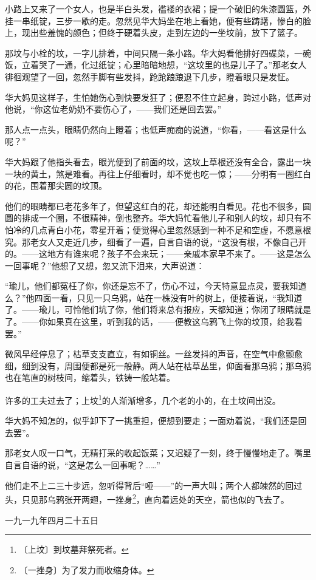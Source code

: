 \documentclass[12pt,UTF-8,openany]{ctexbook}
\begin{document}
\begin{large}
    小路上又来了一个女人，也是半白头发，褴褛的衣裙；提一个破旧的朱漆圆篮，外挂一串纸锭，三步一歇的走。忽然见华大妈坐在地上看她，便有些踌躇，惨白的脸上，现出些羞愧的颜色；但终于硬着头皮，走到左边的一坐坟前，放下了篮子。
    
    那坟与小栓的坟，一字儿排着，中间只隔一条小路。华大妈看他排好四碟菜，一碗饭，立着哭了一通，化过纸锭；心里暗暗地想，“这坟里的也是儿子了。”那老女人徘徊观望了一回，忽然手脚有些发抖，跄跄踉踉退下几步，瞪着眼只是发怔。
    
    华大妈见这样子，生怕她伤心到快要发狂了；便忍不住立起身，跨过小路，低声对他说，“你这位老奶奶不要伤心了，——我们还是回去罢。”
    
    那人点一点头，眼睛仍然向上瞪着；也低声痴痴的说道，“你看，——看这是什么呢？”
    
    华大妈跟了他指头看去，眼光便到了前面的坟，这坟上草根还没有全合，露出一块一块的黄土，煞是难看。再往上仔细看时，却不觉也吃一惊；——分明有一圈红白的花，围着那尖圆的坟顶。
    
    他们的眼睛都已老花多年了，但望这红白的花，却还能明白看见。花也不很多，圆圆的排成一个圈，不很精神，倒也整齐。华大妈忙看他儿子和别人的坟，却只有不怕冷的几点青白小花，零星开着；便觉得心里忽然感到一种不足和空虚，不愿意根究。那老女人又走近几步，细看了一遍，自言自语的说，“这没有根，不像自己开的。——这地方有谁来呢？孩子不会来玩；——亲戚本家早不来了。——这是怎么一回事呢？”他想了又想，忽又流下泪来，大声说道：
    
    “瑜儿，他们都冤枉了你，你还是忘不了，伤心不过，今天特意显点灵，要我知道么？”他四面一看，只见一只乌鸦，站在一株没有叶的树上，便接着说，“我知道了。——瑜儿，可怜他们坑了你，他们将来总有报应，天都知道；你闭了眼睛就是了。——你如果真在这里，听到我的话，——便教这乌鸦飞上你的坟顶，给我看罢。”
    
    微风早经停息了；枯草支支直立，有如铜丝。一丝发抖的声音，在空气中愈颤愈细，细到没有，周围便都是死一般静。两人站在枯草丛里，仰面看那乌鸦；那乌鸦也在笔直的树枝间，缩着头，铁铸一般站着。
    
    许多的工夫过去了；上坟\footnote{〔上坟〕到坟墓拜祭死者。}的人渐渐增多，几个老的小的，在土坟间出没。
    
    华大妈不知怎的，似乎卸下了一挑重担，便想到要走；一面劝着说，“我们还是回去罢”。
    
    那老女人叹一口气，无精打采的收起饭菜；又迟疑了一刻，终于慢慢地走了。嘴里自言自语的说，“这是怎么一回事呢？……”
    
    他们走不上二三十步远，忽听得背后“哑——”的一声大叫；两个人都竦然的回过头，只见那乌鸦张开两翅，一挫身\footnote{〔一挫身〕为了发力而收缩身体。}，直向着远处的天空，箭也似的飞去了。
    
    \hfill 一九一九年四月二十五日
    
\end{large}
\end{document}
